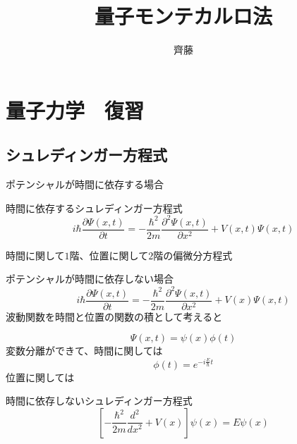 \documentclass[dvipdfmx]{beamer}
\title{量子モンテカルロ法}
\author{齊藤}
\begin{document}
\maketitle
\frame{\tableofcontents[hideallsubsections]}

\section{量子力学　復習}
\subsection{シュレディンガー方程式}

\begin{frame}{\insertsubsection}
    ポテンシャルが時間に依存する場合
    \begin{block}{時間に依存するシュレディンガー方程式}
        \begin{equation}
            i\hbar\dfrac{\partial \Psi(x,t)}{\partial t} = -\dfrac{\hbar^2}{2m}\dfrac{\partial^2 \Psi(x,t)}{\partial x^2} + V(x,t)\Psi(x,t)
        \end{equation}
    \end{block}

    時間に関して$1$階、位置に関して$2$階の偏微分方程式
    \end{frame}

    \begin{frame}{\insertsubsection}
    ポテンシャルが時間に依存しない場合
        \begin{equation}
            i\hbar\dfrac{\partial \Psi(x,t)}{\partial t} = -\dfrac{\hbar^2}{2m}\dfrac{\partial^2 \Psi(x,t)}{\partial x^2} + V(x)\Psi(x,t)
        \end{equation}
    波動関数を時間と位置の関数の積として考えると

        \begin{equation}
            \Psi(x,t) = \psi(x)\phi(t)
        \end{equation}
    変数分離ができて、時間に関しては
        \begin{equation}
            \phi(t) = e^{-i\frac{E}{\hbar}t}
        \end{equation}
    位置に関しては
    \begin{block}{時間に依存しないシュレディンガー方程式}
        \begin{equation}
            \left[-\dfrac{\hbar^2}{2m}\dfrac{d^2}{dx^2} + V(x)\right]\psi(x) = E\psi(x)
        \end{equation}
    \end{block}
    \end{frame}
\end{document}
